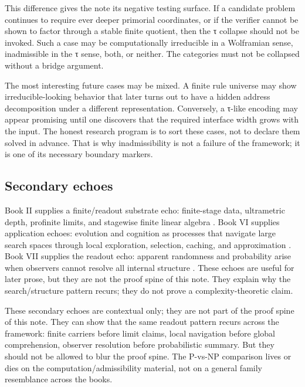 \documentclass{pantarhei-researchnote}
\begin{document}
This difference gives the note its negative testing surface. If a
candidate problem continues to require ever deeper primorial coordinates,
or if the verifier cannot be shown to factor through a stable finite
quotient, then the τ collapse should not be invoked. Such a case may be
computationally irreducible in a Wolframian sense, inadmissible in the τ
sense, both, or neither. The categories must not be collapsed without a
bridge argument.

The most interesting future cases may be mixed. A finite rule universe
may show irreducible-looking behavior that later turns out to have a
hidden address decomposition under a different representation. Conversely,
a τ-like encoding may appear promising until one discovers that the
required interface width grows with the input. The honest research
program is to sort these cases, not to declare them solved in advance.
That is why inadmissibility is not a failure of the framework; it is one
of its necessary boundary markers.

\subsection{Secondary echoes}

Book II supplies a finite/readout substrate echo: finite-stage data,
ultrametric depth, profinite limits, and stagewise finite linear algebra
\cite{PR-II}. Book VI supplies application echoes: evolution and cognition
as processes that navigate large search spaces through local exploration,
selection, caching, and approximation \cite{PR-VI}. Book VII supplies the
readout echo: apparent randomness and probability arise when observers
cannot resolve all internal structure \cite{PR-VII}. These echoes are
useful for later prose, but they are not the proof spine of this note.
They explain why the search/structure pattern recurs; they do not prove a
complexity-theoretic claim.

These secondary echoes are contextual only; they are not part of the
proof spine of this note. They can show that the same readout pattern
recurs across the framework: finite carriers before limit claims, local
navigation before global comprehension, observer resolution before
probabilistic summary. But they should not be allowed to blur the proof
spine. The P-vs-NP comparison lives or dies on the
computation/admissibility material, not on a general family resemblance
across the books.

\end{document}
